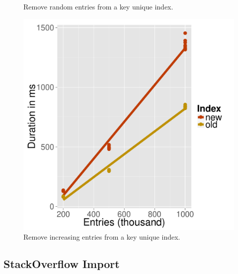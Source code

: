 \documentclass[11pt,a4paper,oneside]{article}
\begin{document}
\begin{figure}
{\begin{minipage}{0.3\textwidth}
      \caption{Remove random entries from a key unique index.}
      \label{fig:unique_random_remove_numNodes}
      \end{minipage}
      \hspace{0.05\textwidth}
      \begin{minipage}{0.3\textwidth}
      \includegraphics[scale=0.30]{images/unique_increasing_remove.pdf} 
      \caption{Remove increasing entries from a key unique index.}
      \label{fig:unique_increasing_remove}
      \end{minipage}
    }
\end{figure}


\subsection{StackOverflow Import} %
\label{sub:stackoverflow_import}
\end{document}
